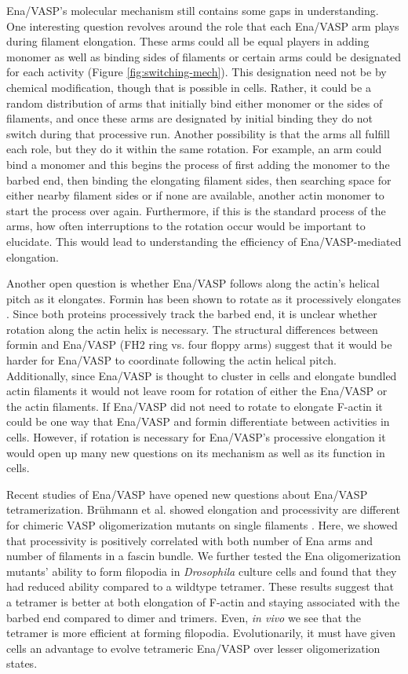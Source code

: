 Ena/VASP's molecular mechanism still contains some gaps in understanding. One interesting question revolves around the role that each Ena/VASP arm plays during filament elongation. These arms could all be equal players in adding monomer as well as binding sides of filaments or certain arms could be designated for each activity (Figure \ref{fig:switching-mech}). This designation need not be by chemical modification, though that is possible in cells. Rather, it could be a random distribution of arms that initially bind either monomer or the sides of filaments, and once these arms are designated by initial binding they do not switch during that processive run. Another possibility is that the arms all fulfill each role, but they do it within the same rotation. For example, an arm could bind a monomer and this begins the process of first adding the monomer to the barbed end, then binding the elongating filament sides, then searching space for either nearby filament sides or if none are available, another actin monomer to start the process over again. Furthermore, if this is the standard process of the arms, how often interruptions to the rotation occur would be important to elucidate. This would lead to understanding the efficiency of Ena/VASP-mediated elongation.  

Another open question is whether Ena/VASP follows along the actin's helical pitch as it elongates. Formin has been shown to rotate as it processively elongates \citep{mizuno_rotational_2011}. Since both proteins processively track the barbed end, it is unclear whether rotation along the actin helix is necessary. The structural differences between formin and Ena/VASP (FH2 ring vs. four floppy arms) suggest that it would be harder for Ena/VASP to coordinate following the actin helical pitch. Additionally, since Ena/VASP is thought to cluster in cells and elongate bundled actin filaments it would not leave room for rotation of either the Ena/VASP or the actin filaments. If Ena/VASP did not need to rotate to elongate F-actin it could be one way that Ena/VASP and formin differentiate between activities in cells. However, if rotation is necessary for Ena/VASP's processive elongation it would open up many new questions on its mechanism as well as its function in cells. 

Recent studies of Ena/VASP have opened new questions about Ena/VASP tetramerization. Br\"{u}hmann et al. showed elongation and processivity are different for chimeric VASP oligomerization mutants on single filaments \citep{bruhmann_distinct_2017}. Here, we showed that processivity is positively correlated with both number of Ena arms and number of filaments in a fascin bundle. We further tested the Ena oligomerization mutants' ability to form filopodia in \textit{Drosophila} culture cells and found that they had reduced ability compared to a wildtype tetramer. These results suggest that a tetramer is better at both elongation of F-actin and staying associated with the barbed end compared to dimer and trimers. Even, \textit{in vivo} we see that the tetramer is more efficient at forming filopodia. Evolutionarily, it must have given cells an advantage to evolve tetrameric Ena/VASP over lesser oligomerization states. 

